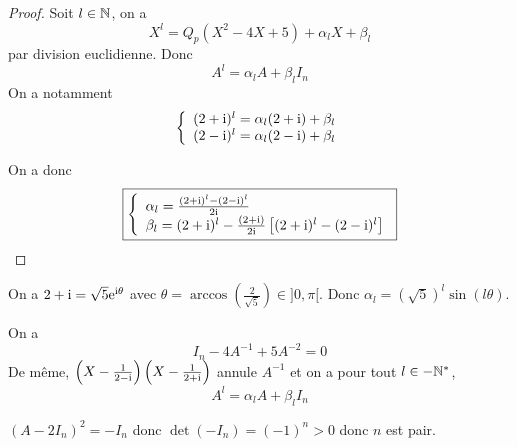 \documentclass[12pt]{article}
\begin{document}
\begin{proof}
	Soit $l\in\mathbb{N}$, on a 
	\begin{equation}
		X^{l}=Q_{p}(X^{2}-4X+5)+\alpha_{l}X+\beta_{l}
	\end{equation}
	par division euclidienne. Donc 
	\begin{equation}
		A^{l}=\alpha_{l}A+\beta_{l}I_{n}
	\end{equation}
	On a notamment 
	\begin{equation}
		\left\lbrace
			\begin{array}[]{l}
				(2+\i)^{l}=\alpha_{l}(2+\i)+\beta_{l}\\
				(2-\i)^{l}=\alpha_{l}(2-\i)+\beta_{l}
			\end{array}
		\right.
	\end{equation}

	On a donc 
	\begin{equation}
		\boxed{
			\left\lbrace
			\begin{array}[]{l}
				\alpha_{l}=\frac{(2+\i)^{l}-(2-\i)^{l}}{2\i}\\
				\beta_{l}=(2+\i)^{l}-\frac{(2+\i)}{2\i}\left[(2+\i)^{l}-(2-\i)^{l}\right]
			\end{array}
		\right.
		}
	\end{equation}
\end{proof}

\begin{remark}
	On a $2+\mathrm{i}=\sqrt{5}\mathrm{e}^{\mathrm{i}\theta}$ avec $\theta=\arccos\left(\frac{2}{\sqrt{5}}\right)\in]0,\pi[$. Donc $\alpha_{l}=\left(\sqrt{5}\right)^{l}\sin(l\theta)$.
\end{remark}

\begin{remark}
	On a 
	\begin{equation}
		I_{n}-4A^{-1}+5A^{-2}=0
	\end{equation}
	De même, $\left(X-\frac{1}{2-\mathrm{i}}\right)\left(X-\frac{1}{2+\mathrm{i}}\right)$ annule $A^{-1}$ et on a pour tout $l\in-\mathbb{N}^{*}$,
	\begin{equation}
		A^{l}=\alpha_{l}A+\beta_{l}I_{n}
	\end{equation}
\end{remark}

\begin{remark}
	$(A-2I_{n})^{2}=-I_{n}$ donc $\det(-I_{n})=(-1)^{n}>0$ donc $n$ est pair.
\end{remark}
\end{document}

